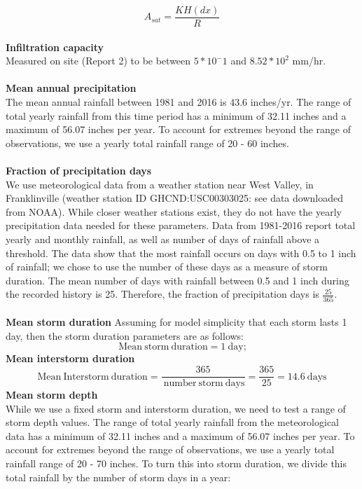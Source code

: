 \documentclass[12pt]{article}
\begin{document}
{\begin{equation}
A_{sat} = \frac{KH(dx)}{R}
\end{equation}
\\
\noindent
{\textbf{Infiltration capacity}}
\\
Measured on site (Report 2) to be between $5 * 10^-1$ and $8.52 * 10^2$ mm/hr.
\\
\\
{\textbf{Mean annual precipitation}}
\\
\noindent
The mean annual rainfall between 1981 and 2016 is 43.6 inches/yr. The range of total yearly rainfall from this time period has a minimum of 32.11 inches and a maximum of 56.07 inches per year. To account for extremes beyond the range of observations, we use a yearly total rainfall range of 20 - 60 inches. 
\\
\\
\noindent
{\textbf{Fraction of precipitation days}}
\\
\noindent
We use meteorological data from a weather station near West Valley, in Franklinville (weather station ID GHCND:USC00303025: see data downloaded from NOAA). While closer weather stations exist, they do not have the yearly precipitation data needed for these parameters. Data from 1981-2016 report total yearly and monthly rainfall, as well as number of days of rainfall above a threshold. The data show that the most rainfall occurs on days with 0.5 to 1 inch of rainfall; we chose to use the number of these days as a measure of storm duration. The mean number of days with rainfall between 0.5 and 1 inch during the recorded history is 25. Therefore, the fraction of precipitation days is $\frac{25}{365}$.
\\
\\
\noindent
{\textbf{Mean storm duration}}
 Assuming for model simplicity that each storm lasts 1 day, then the storm duration parameters are as follows:
\noindent
\begin{equation}
\mathrm{\ Mean \ storm \ duration} = 1 \mathrm{\ day};
\end{equation}
\noindent
{\textbf{Mean interstorm duration}}
\begin{equation}
\mathrm{Mean\ Interstorm\ duration} = \frac{365}{\mathrm{\ number \ storm \ days}} = \frac{365}{25} = 14.6 \mathrm{ \ days}
\end{equation}
\noindent
{\textbf{Mean storm depth}}
\\
\noindent
While we use a fixed storm and interstorm duration, we need to test a range of storm depth values. The range of total yearly rainfall from the meteorological data has a minimum of 32.11 inches and a maximum of 56.07 inches per year. To account for extremes beyond the range of observations, we use a yearly total rainfall range of 20 - 70 inches. To turn this into storm duration, we divide this total rainfall by the number of storm days in a year:

}
\end{document}
